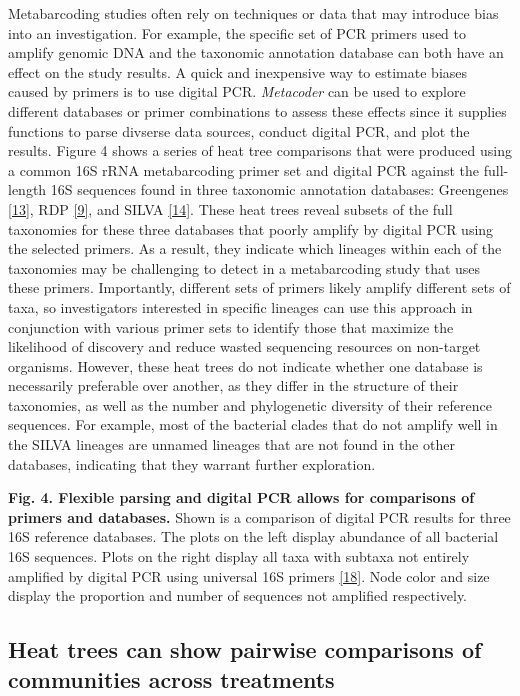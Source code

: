 \documentclass[10pt,letterpaper]{article}
\begin{document}
Metabarcoding studies often rely on techniques or data that may
introduce bias into an investigation. For example, the specific set of
PCR primers used to amplify genomic DNA and the taxonomic annotation
database can both have an effect on the study results. A quick and
inexpensive way to estimate biases caused by primers is to use digital
PCR. \emph{Metacoder} can be used to explore different databases or
primer combinations to assess these effects since it supplies functions
to parse divserse data sources, conduct digital PCR, and plot the
results. Figure 4 shows a series of heat tree comparisons that were
produced using a common 16S rRNA metabarcoding primer set and digital
PCR against the full-length 16S sequences found in three taxonomic
annotation databases: Greengenes \hyperref[csl:13]{[13]}, RDP
\hyperref[csl:9]{[9]}, and SILVA \hyperref[csl:14]{[14]}. These heat
trees reveal subsets of the full taxonomies for these three databases
that poorly amplify by digital PCR using the selected primers. As a
result, they indicate which lineages within each of the taxonomies may
be challenging to detect in a metabarcoding study that uses these
primers. Importantly, different sets of primers likely amplify different
sets of taxa, so investigators interested in specific lineages can use
this approach in conjunction with various primer sets to identify those
that maximize the likelihood of discovery and reduce wasted sequencing
resources on non-target organisms. However, these heat trees do not
indicate whether one database is necessarily preferable over another, as
they differ in the structure of their taxonomies, as well as the number
and phylogenetic diversity of their reference sequences. For example,
most of the bacterial clades that do not amplify well in the SILVA
lineages are unnamed lineages that are not found in the other databases,
indicating that they warrant further exploration.

\textbf{Fig. 4. Flexible parsing and digital PCR allows for comparisons
of primers and databases.} Shown is a comparison of digital PCR results
for three 16S reference databases. The plots on the left display
abundance of all bacterial 16S sequences. Plots on the right display all
taxa with subtaxa not entirely amplified by digital PCR using universal
16S primers \hyperref[csl:18]{[18]}. Node color and size display the
proportion and number of sequences not amplified respectively.


\subsection*{Heat trees can show pairwise comparisons of communities
across
treatments}\label{heat-trees-can-show-pairwise-comparisons-of-communities-across-treatments}
\end{document}
